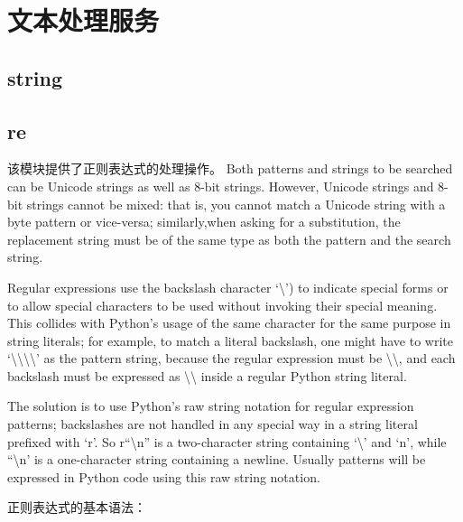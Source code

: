 \chapter{文本处理服务}
\section{string}




\section{re}
该模块提供了正则表达式的处理操作。
Both patterns and strings to be searched can be Unicode strings as well as 8-bit strings. However, Unicode strings and 8-bit strings cannot be mixed: that is, you cannot match a Unicode string with a byte pattern or vice-versa; similarly,when asking for a substitution, the replacement string must be of the same type as both the pattern and the search string.
\par
Regular expressions use the backslash character \textquoteleft{}\textbackslash{}\textquoteright{}) to indicate special forms or to allow special characters to be used without invoking their special meaning. This collides with Python’s usage of the same character for the same purpose in string literals; for example, to match a literal backslash, one might have to write \textquoteleft{}\textbackslash{}\textbackslash{}\textbackslash{}\textbackslash{}\textquoteright{} as the pattern string, because the regular expression must be \textbackslash{}\textbackslash{}, and each backslash must be expressed as \textbackslash{}\textbackslash{} inside a regular Python string literal.
\par
The solution is to use Python’s raw string notation for regular expression patterns; backslashes are not handled in any
special way in a string literal prefixed with \textquoteleft{r}\textquoteright{}. So r\textquotedblleft{}\textbackslash{n}\textquotedblright{} is a two-character string containing \textquoteleft{}\textbackslash{}\textquoteright{} and \textquoteleft{n}\textquoteright{}, while
\textquotedblleft{}\textbackslash{n}\textquoteright{} is a one-character string containing a newline. Usually patterns will be expressed in Python code using this raw
string notation.\\
\par
正则表达式的基本语法：
